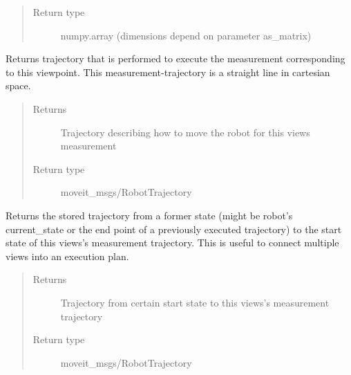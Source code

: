 \documentclass[letterpaper,10pt,english]{sphinxmanual}
\begin{document}
\begin{fulllineitems}
\begin{fulllineitems}
\begin{quote}
\begin{description}
\item[{Return type}] \leavevmode
numpy.array (dimensions depend on parameter as\_matrix)

\end{description}\end{quote}

\end{fulllineitems}


\begin{fulllineitems}
\label{\detokenize{module_view:agiprobot_measurement.viewpoint.ViewPoint.get_trajectory_for_measurement}}
Returns trajectory that is performed to execute the measurement corresponding to this viewpoint.
This measurement-trajectory is a straight line in cartesian space.
\begin{quote}\begin{description}
\item[{Returns}] \leavevmode
Trajectory describing how to move the robot for this views measurement

\item[{Return type}] \leavevmode
moveit\_msgs/RobotTrajectory

\end{description}\end{quote}

\end{fulllineitems}


\begin{fulllineitems}
\label{\detokenize{module_view:agiprobot_measurement.viewpoint.ViewPoint.get_trajectory_to_view}}
Returns the stored trajectory from a former state (might be robot’s current\_state or the end point of a previously executed trajectory) to
the start state of this views’s measurement trajectory. This is useful to connect multiple views into an execution plan.
\begin{quote}\begin{description}
\item[{Returns}] \leavevmode
Trajectory from certain start state to this views’s measurement trajectory

\item[{Return type}] \leavevmode
moveit\_msgs/RobotTrajectory


\end{description}
\end{quote}
\end{fulllineitems}
\end{fulllineitems}
\end{document}
